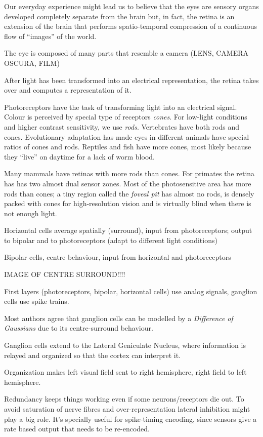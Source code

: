 Our everyday experience might lead us to believe that the eyes are sensory organs developed completely separate from the brain but, in fact, the retina is an extension of the brain that performs spatio-temporal compression of a continuous flow of ``images'' of the world.

The eye is composed of many parts that resemble a camera (LENS, CAMERA OSCURA, FILM)

After light has been transformed into an electrical representation, the retina takes over and computes a representation of it.

Photoreceptors have the task of transforming light into an electrical signal. Colour is perceived by special type of receptors \emph{cones}. For low-light conditions and higher contrast sensitivity, we use \emph{rods}. Vertebrates have both rods and cones. Evolutionary adaptation has made eyes in different animals have special ratios of cones and rods. Reptiles and fish have more cones, most likely because they ``live'' on daytime for a lack of worm blood.

Many mammals have retinas with more rods than cones. For primates the retina has has two almost dual sensor zones. Most of the photosensitive area has more rods than cones; a tiny region called the \emph{foveal pit} has almost no rods, is densely packed with cones for high-resolution vision and is virtually blind when there is not enough light.

Horizontal cells average spatially (surround), input from photoreceptors; output to bipolar and to photoreceptors (adapt to different light conditions)

Bipolar cells, centre behaviour, input from horizontal and photoreceptors

IMAGE OF CENTRE SURROUND!!!!

First layers (photoreceptors, bipolar, horizontal cells) use analog signals, ganglion cells use spike trains.

Most authors agree that ganglion cells can be modelled by a \emph{Difference of Gaussians} due to its centre-surround behaviour.

Ganglion cells extend to the Lateral Geniculate Nucleus, where information is relayed and organized so that the cortex can interpret it. 

Organization makes left visual field sent to right hemisphere, right field to left hemisphere.

Redundancy keeps things working even if some neurons/receptors die out. To avoid saturation of nerve fibres and over-representation lateral inhibition might play a big role. It's specially useful for spike-timing encoding, since sensors give a rate based output that needs to be re-encoded.
